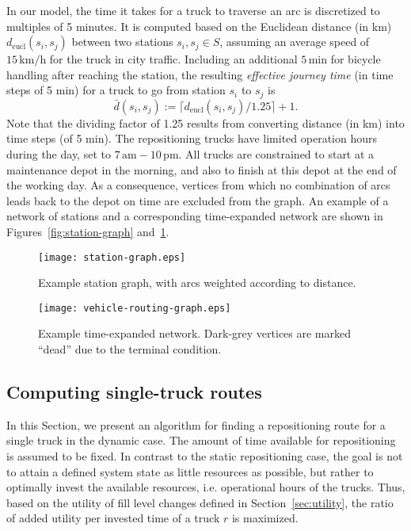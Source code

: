 \documentclass{article}
\begin{document}
In our model, the time it takes for a truck to traverse an arc is discretized to
multiples of 5 minutes. It is computed based on the Euclidean distance (in km)
$d_{\textrm{eucl}}(s_{i},s_{j})$ between two stations $s_{i},s_{j}\in S$,
assuming an average speed of $15\,\text{km/h}$ for the truck in city traffic.
Including an additional $5\,\text{min}$ for bicycle handling after reaching the
station, the resulting \emph{effective journey time} (in time steps of 5 min) for a truck to go from
station $s_{i}$ to $s_{j}$ is
\begin{equation}
  \bar d(s_{i},s_{j}) := \lceil d_{\textrm{eucl}}(s_{i},s_{j})/1.25 \rceil + 1.
\end{equation}
Note that the dividing factor of 1.25 results from converting distance (in km)
into time steps (of 5 min). The repositioning trucks have limited operation
hours during the day, set to $7\,\text{am}-10\,\text{pm}$. All trucks are
constrained to start at a maintenance depot in the morning, and also to finish
at this depot at the end of the working day. As a consequence, vertices from
which no combination of arcs leads back to the depot on time are excluded from
the graph. An example of a network of stations and a corresponding time-expanded
network are shown in Figures~\ref{fig:station-graph}
and~\ref{fig:station-time-graph}.
\begin{figure}
\begin{minipage}[b]{0.45\linewidth}
\centering
\texttt{[image: station-graph.eps]}
\caption{Example station graph, with arcs weighted according to distance.}
\label{fig:station-graph}
\end{minipage}
\hfill
\begin{minipage}[b]{0.53\linewidth}
\centering
\texttt{[image: vehicle-routing-graph.eps]}
\caption{Example time-expanded network. Dark-grey vertices are marked ``dead''
  due to the terminal condition.}
\label{fig:station-time-graph}
\end{minipage}
\end{figure}

\subsection{Computing single-truck routes}\label{sec:greedy}
In this Section, we present an algorithm for finding a repositioning route for a
single truck in the dynamic case. The amount of time available for repositioning
is assumed to be fixed. In contrast to the static repositioning case, the goal
is not to attain a defined system state as little resources as possible, but
rather to optimally invest the available resources, i.e. operational hours of
the trucks. Thus, based on the utility of fill level changes defined in
Section~\ref{sec:utility}, the ratio of added utility per invested time of a
truck $r$ is maximized.
\end{document}
